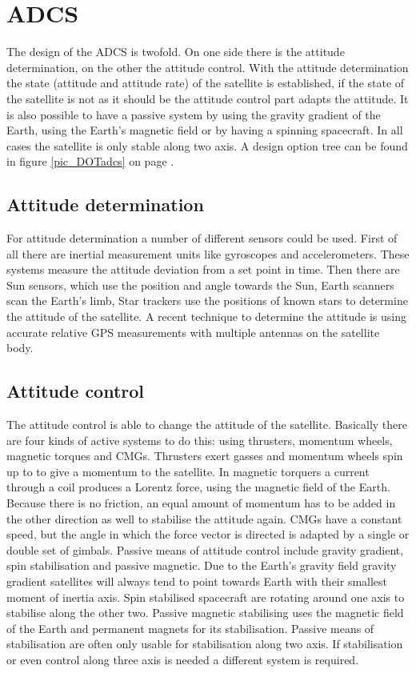 \section{ADCS}
\label{sect_adcs}
The design of the \ac{ADCS} is twofold. On one side there is the attitude determination, on the other the attitude control. With the attitude determination the state (attitude and attitude rate) of the satellite is established, if the state of the satellite is not as it should be the attitude control part adapts the attitude. It is also possible to have a passive system by using the gravity gradient of the Earth, using the Earth's magnetic field or by having a spinning spacecraft. In all cases the satellite is only stable along two axis. A design option tree can be found in figure \ref{pic_DOTadcs} on page \pageref{pic_DOTadcs}.

\subsection{Attitude determination}
For attitude determination a number of different sensors could be used. First of all there are inertial measurement units like gyroscopes and accelerometers. These systems measure the attitude deviation from a set point in time. Then there are Sun sensors, which use the position and angle towards the Sun,  Earth scanners scan the Earth's limb, Star trackers use the positions of known stars to determine the attitude of the satellite. A recent technique to determine the attitude is using accurate relative \ac{GPS} measurements with multiple antennas on the satellite body.

\subsection{Attitude control}
The attitude control is able to change the attitude of the satellite. Basically there are four kinds of active systems to do this: using thrusters, momentum wheels, magnetic torques and \acp{CMG}. Thrusters exert gasses and momentum wheels spin up to to give a momentum to the satellite. In magnetic torquers a current through a coil produces a Lorentz force, using the magnetic field of the Earth. Because there is no friction, an equal amount of momentum has to be added in the other direction as well to stabilise the attitude again. \ac{CMG}s have a constant speed, but the angle in which the force vector is directed is adapted by a single or double set of gimbals. Passive means of attitude control include gravity gradient, spin stabilisation and passive magnetic. Due to the Earth's gravity field gravity gradient satellites will always tend to point towards Earth with their smallest moment of inertia axis. Spin stabilised spacecraft are rotating around one axis to stabilise along the other two. Passive magnetic stabilising uses the magnetic field of the Earth and permanent magnets for its stabilisation. Passive means of stabilisation are often only usable for stabilisation along two axis. If stabilisation or even control along three axis is needed a different system is required.

